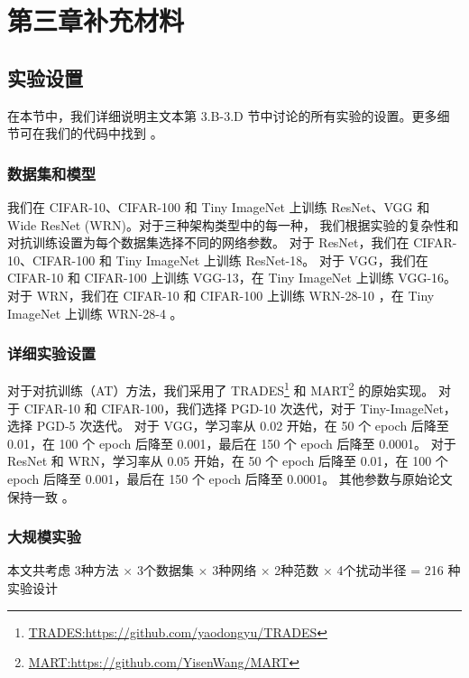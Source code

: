 \chapter{第三章补充材料}

\section{实验设置}
在本节中，我们详细说明主文本第 3.B-3.D 节中讨论的所有实验的设置。更多细节可在我们的代码中找到 \cite{github}。

\subsection{数据集和模型}
我们在 CIFAR-10、CIFAR-100 和 Tiny ImageNet 上训练 ResNet、VGG 和 Wide ResNet (WRN)。对于三种架构类型中的每一种，
我们根据实验的复杂性和对抗训练设置为每个数据集选择不同的网络参数。
对于 ResNet，我们在 CIFAR-10、CIFAR-100 和 Tiny ImageNet 上训练 ResNet-18。 
对于 VGG，我们在 CIFAR-10 和 CIFAR-100 上训练 VGG-13，在 Tiny ImageNet 上训练 VGG-16。
对于 WRN，我们在 CIFAR-10 和 CIFAR-100 上训练 WRN-28-10 \cite{DBLP:conf/icml/WangPDL0Y23}，在 Tiny ImageNet 上训练 WRN-28-4 \cite{DBLP:conf/aistats/ErichsonLXUCM24}。

\subsection{详细实验设置}
对于对抗训练（AT）方法，我们采用了 TRADES\footnote{\href{https://github.com/yaodongyu/TRADES}{TRADES:https://github.com/yaodongyu/TRADES}} 和 MART\footnote{\href{https://github.com/YisenWang/MART}{MART:https://github.com/YisenWang/MART}} 的原始实现。
对于 CIFAR-10 和 CIFAR-100，我们选择 PGD-10 次迭代，对于 Tiny-ImageNet，选择 PGD-5 次迭代。
对于 VGG，学习率从 0.02 开始，在 50 个 epoch 后降至 0.01，在 100 个 epoch 后降至 0.001，最后在 150 个 epoch 后降至 0.0001。
对于 ResNet 和 WRN，学习率从 0.05 开始，在 50 个 epoch 后降至 0.01，在 100 个 epoch 后降至 0.001，最后在 150 个 epoch 后降至 0.0001。
其他参数与原始论文保持一致 \cite{fat,mart,trades}。

\subsection{大规模实验}

本文共考虑 3种方法 $\times$ 3个数据集 $\times$ 3种网络 $\times$ 2种范数 $\times$ 4个扰动半径 = 216 种实验设计

